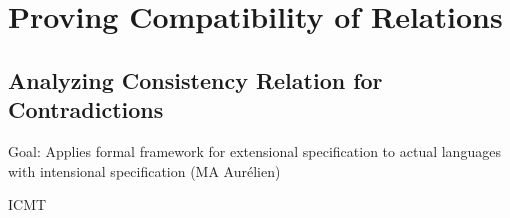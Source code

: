 \chapter{Proving Compatibility of Relations     
}
\label{sec:correctness:compatibility}

\section{Analyzing Consistency Relation for Contradictions}
Goal: Applies formal framework for extensional specification to actual languages with intensional specification (MA Aurélien)

\begin{copiedFrom}{ICMT}


\end{copiedFrom}
